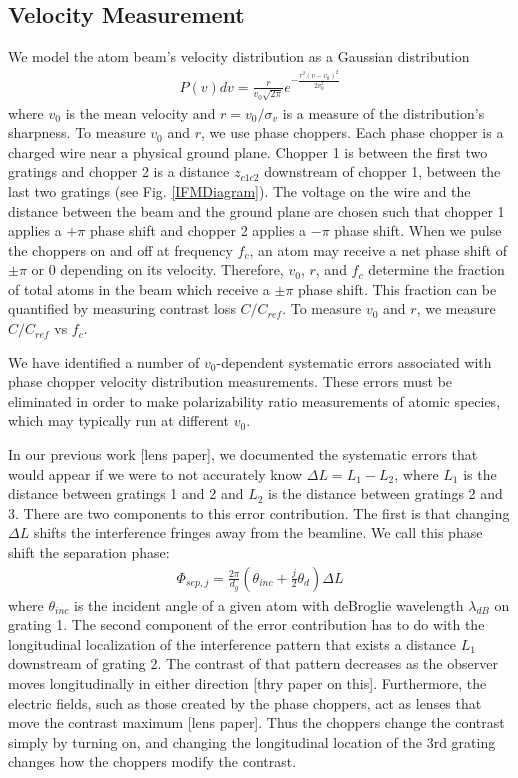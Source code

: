 \documentclass[twocolumn, prl,showpacs,superscriptaddress]{revtex4-1}   %
\newcommand{\figref}[1]{Fig. \ref{#1}}
\begin{document}
\subsection{Velocity Measurement}

We model the atom beam's velocity distribution as a Gaussian distribution
\begin{align}
	P(v)dv = \frac{r}{v_0\sqrt{2\pi}}e^{-\frac{r^2(v-v_0)^2}{2v_0^2}}
\end{align}
where $v_0$ is the mean velocity and $r = v_0/\sigma_v$ is a measure of the distribution's sharpness. To measure $v_0$ and $r$, we use phase choppers. Each phase chopper is a charged wire near a physical ground plane. Chopper 1 is between the first two gratings and chopper 2 is a distance $z_{c1c2}$ downstream of chopper 1, between the last two gratings (see \figref{IFMDiagram}). The voltage on the wire and the distance between the beam and the ground plane are chosen such that chopper 1 applies a $+\pi$ phase shift and chopper 2 applies a $-\pi$ phase shift. When we pulse the choppers on and off at frequency $f_c$, an atom may receive a net phase shift of $\pm\pi$ or $0$ depending on its velocity. Therefore, $v_0$, $r$, and $f_c$ determine the fraction of total atoms in the beam which receive a $\pm\pi$ phase shift. This fraction can be quantified by measuring contrast loss $C/C_{ref}$. To measure $v_0$ and $r$, we measure $C/C_{ref}$ vs $f_c$.

We have identified a number of $v_0$-dependent systematic errors associated with phase chopper velocity distribution measurements. These errors must be eliminated in order to make polarizability ratio measurements of atomic species, which may typically run at different $v_0$.

In our previous work [lens paper], we documented the systematic errors that would appear if we were to not accurately know $\Delta L = L_1 - L_2$, where $L_1$ is the distance between gratings 1 and 2 and $L_2$ is the distance between gratings 2 and 3. There are two components to this error contribution. The first is that changing $\Delta L$ shifts the interference fringes away from the beamline. We call this phase shift the separation phase:
\begin{align}
	\Phi_{sep,j} = \frac{2\pi}{d_g}
	\left(
		\theta_{inc} + \frac{j}{2}\theta_d
	\right) \Delta L
	\label{phiSep}
\end{align}
where $\theta_{inc}$ is the incident angle of a given atom with deBroglie wavelength $\lambda_{dB}$ on grating 1. The second component of the error contribution has to do with the longitudinal localization of the interference pattern that exists a distance $L_1$ downstream of grating 2. The contrast of that pattern decreases as the observer moves longitudinally in either direction [thry paper on this]. Furthermore, the electric fields, such as those created by the phase choppers, 
act as lenses that move the contrast maximum [lens paper]. Thus the choppers change the contrast simply by turning on, and changing the longitudinal location of the 3rd grating changes how the choppers modify the contrast.
\end{document}
